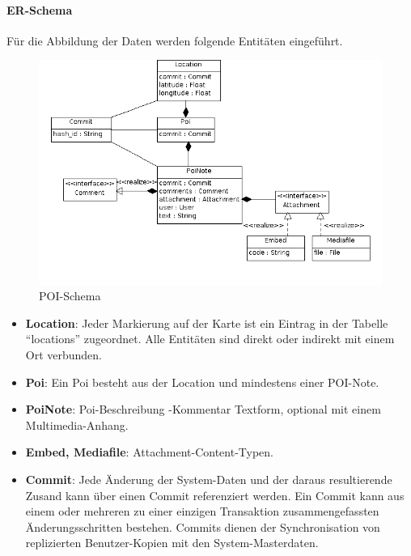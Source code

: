 \paragraph{ER-Schema}
Für die Abbildung der Daten werden folgende Entitäten eingeführt. \\

  \begin{figure}[H]
      \centering
	  \includegraphics[scale=0.6]{bilder/uml/er_poi.png}
  	  \caption{POI-Schema}
  \end{figure}

\begin{itemize}[leftmargin=*,noitemsep,topsep=1ex,parsep=0pt,partopsep=0pt]
\item \textbf{Location}: Jeder Markierung auf der Karte ist ein Eintrag in der Tabelle "`locations"' zugeordnet. Alle Entitäten sind direkt oder indirekt mit einem Ort verbunden.
\item \textbf{Poi}: Ein Poi besteht aus der Location und mindestens einer POI-Note.
\item \textbf{PoiNote}: Poi-Beschreibung -Kommentar Textform, optional mit einem Multimedia-Anhang.
\item \textbf{Embed, Mediafile}: Attachment-Content-Typen.
\item \textbf{Commit}: Jede Änderung der System-Daten und der daraus resultierende Zusand kann über einen Commit referenziert werden. Ein Commit kann aus einem oder mehreren zu einer einzigen Transaktion zusammengefassten Änderungsschritten bestehen. Commits dienen der Synchronisation von replizierten Benutzer-Kopien mit den System-Masterdaten. 
\end{itemize}


